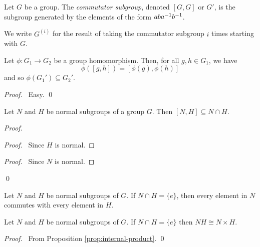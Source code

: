 \begin{df}
Let $G$ be a group. The \emph{commutator subgroup}, denoted $[G,G]$ or $G'$, is the subgroup generated by the elements of the form $ab{a}^{-1}{b}^{-1}$.
 
We write $G^{(i)}$ for the result of taking the commutator subgroup $i$ times starting with $G$.
\end{df}

\begin{lm}
\label{lm:commutator-characteristic}
Let $\phi : G_1 \rightarrow G_2$ be a group homomorphism. Then, for all $g,h \in G_1$, we have
\[ \phi([g,h]) = [\phi(g), \phi(h)] \]
and so $\phi(G_1') \subseteq G_2'$.
\end{lm}

\begin{proof}
\pf\ Easy. \qed
\end{proof}

\begin{lm}
Let $N$ and $H$ be normal subgroups of a group $G$. Then $[N,H] \subseteq N \cap H$.
\end{lm}

\begin{proof}
\pf
{}
\begin{proof}
	\pf\ Since $H$ is normal.
\end{proof}
\begin{proof}
	\pf\ Since $N$ is normal.
\end{proof}
\qed
\end{proof}

\begin{cor}
\label{cor:N-H-commute}
Let $N$ and $H$ be normal subgroups of $G$. If $N \cap H = \{e\}$, then every element in $N$ commutes with every element in $H$.
\end{cor}

\begin{prop}
\label{prop:NH-cong-N-times-H}
Let $N$ and $H$ be normal subgroups of $G$. If $N \cap H = \{e\}$ then $NH \cong N \times H$.
\end{prop}

\begin{proof}
\pf\ From Proposition \ref{prop:internal-product}. \qed
\end{proof}

